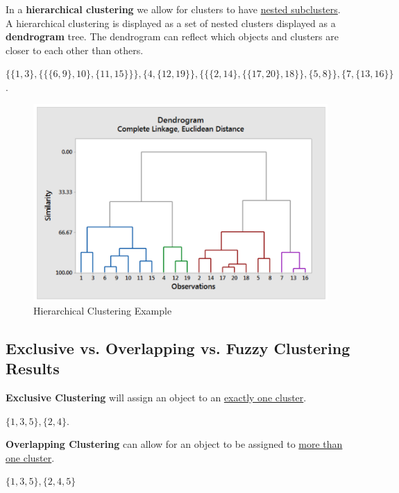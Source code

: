 \documentclass[11pt]{elegantbook}
\begin{document}
\begin{definition}
    In a \textbf{hierarchical clustering} we allow for clusters to have \underline{nested subclusters}.\\
    A hierarchical
    clustering is displayed as a set of nested clusters displayed as a \textbf{dendrogram} tree. The dendrogram can reflect which objects and clusters are closer to each other than others.
\end{definition}
\begin{example}
    $\{\{1,3\},\{\{\{6,9\},10\},\{11,15\}\}\},\{4,\{12,19\}\},\{\{\{2,14\},\{\{17,20\},18\}\},\{5,8\}\},\{7,\{13,16\}\}$.
\end{example}
\begin{center}\begin{figure}[htbp]
    \centering
    \includegraphics[scale=0.25]{Hierarchical Clustering.png}
    \caption{Hierarchical Clustering Example}
    \label{}
\end{figure}\end{center}

\subsection{Exclusive vs. Overlapping vs. Fuzzy Clustering Results}
\begin{definition}
    \textbf{Exclusive Clustering} will assign an object to an \underline{exactly one cluster}.
\end{definition}
\begin{example}
    $\{1,3,5\},\{2,4\}$.
\end{example}
\begin{definition}
    \textbf{Overlapping Clustering} can allow for an object to be assigned to \underline{more than one cluster}.
\end{definition}
\begin{example}
    $\{1,3,5\},\{2,4,5\}$
\end{example}
\end{document}
